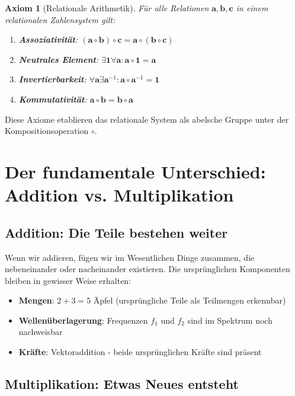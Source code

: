 \documentclass[11pt,a4paper]{article}
\newcommand{\primrel}[1]{\mathbf{#1}}
\newtheorem{axiom}{Axiom}[section]
\begin{document}
	\begin{axiom}[Relationale Arithmetik]
		Für alle Relationen $\primrel{a}, \primrel{b}, \primrel{c}$ in einem relationalen Zahlensystem gilt:
		\begin{enumerate}
			\item \textbf{Assoziativität}: $(\primrel{a} \circ \primrel{b}) \circ \primrel{c} = \primrel{a} \circ (\primrel{b} \circ \primrel{c})$
			\item \textbf{Neutrales Element}: $\exists \primrel{1} \forall \primrel{a}: \primrel{a} \circ \primrel{1} = \primrel{a}$
			\item \textbf{Invertierbarkeit}: $\forall \primrel{a} \exists \primrel{a}^{-1}: \primrel{a} \circ \primrel{a}^{-1} = \primrel{1}$
			\item \textbf{Kommutativität}: $\primrel{a} \circ \primrel{b} = \primrel{b} \circ \primrel{a}$
		\end{enumerate}
	\end{axiom}
	
	Diese Axiome etablieren das relationale System als abelsche Gruppe unter der Kompositionsoperation $\circ$.
	
	\section{Der fundamentale Unterschied: Addition vs. Multiplikation}
	
	\subsection{Addition: Die Teile bestehen weiter}
	
	Wenn wir addieren, fügen wir im Wesentlichen Dinge zusammen, die nebeneinander oder nacheinander existieren. Die ursprünglichen Komponenten bleiben in gewisser Weise erhalten:
	
	\begin{itemize}
		\item \textbf{Mengen}: $2 + 3 = 5$ Äpfel (ursprüngliche Teile als Teilmengen erkennbar)
		\item \textbf{Wellenüberlagerung}: Frequenzen $f_1$ und $f_2$ sind im Spektrum noch nachweisbar
		\item \textbf{Kräfte}: Vektoraddition - beide ursprünglichen Kräfte sind präsent
	\end{itemize}
	
	\subsection{Multiplikation: Etwas Neues entsteht}
	
\end{document}
